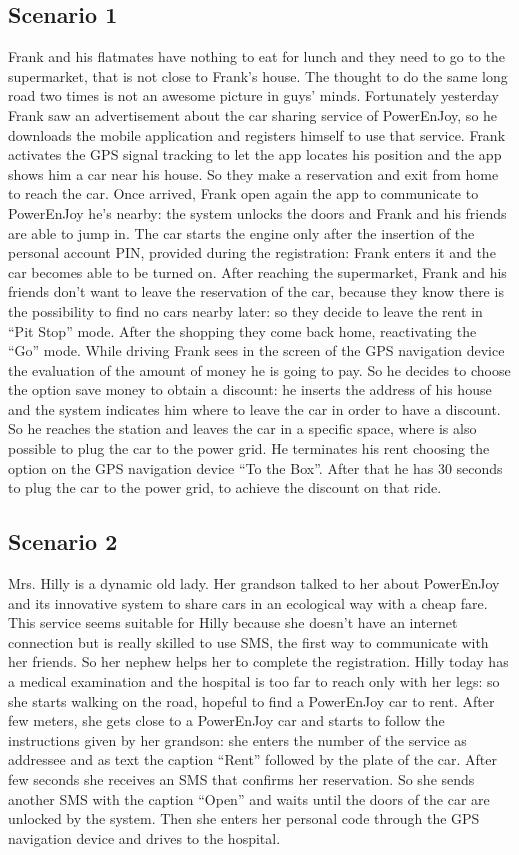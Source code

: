 \subsection{Scenario 1}
Frank and his flatmates have nothing to eat for lunch and they need to go to the supermarket, that is not close to Frank’s house.
The thought to do the same long road two times is not an awesome picture in guys’ minds.
Fortunately yesterday Frank saw an advertisement about the car sharing service of PowerEnJoy, so he downloads the mobile application and registers himself to use that service.
Frank activates the GPS signal tracking to let the app locates his position and the app shows him a car near his house.
So they make a reservation and exit from home to reach the car.
Once arrived, Frank open again the app to communicate to PowerEnJoy he’s nearby: the system unlocks the doors and Frank and his friends are able to jump in.
The car starts the engine only after the insertion of the personal account PIN, provided during the registration: Frank enters it and the car becomes able to be turned on.
After reaching the supermarket, Frank and his friends don’t want to leave the reservation of the car, because they know there is the possibility to find no cars nearby later: so they decide to leave the rent in “Pit Stop” mode.
After the shopping they come back home, reactivating the “Go” mode.
While driving Frank sees in the screen of the GPS navigation device the evaluation of the amount of money he is going to pay.
So he decides to choose the option save money to obtain a discount: he inserts the address of his house and the system indicates him where to leave the car in order to have a discount.
So he reaches the station and leaves the car in a specific space, where is also possible to plug the car to the power grid.
He terminates his rent choosing the option on the GPS navigation device  “To the Box”.
After that he has 30 seconds to plug the car to the power grid, to achieve the discount on that ride.

\subsection{Scenario 2}
Mrs. Hilly is a dynamic old lady.
Her grandson talked to her about PowerEnJoy and its innovative system to share cars in an ecological way with a cheap fare.
This service seems suitable for Hilly because she doesn’t have an internet connection but is really skilled to use SMS, the first way to communicate with her friends.
So her nephew helps her to complete the registration.
Hilly today has a medical examination and the hospital is too far to reach only with her legs: so she starts walking on the road, hopeful to find a PowerEnJoy car to rent.
After few meters, she gets close to a PowerEnJoy car and starts to follow the instructions given by her grandson: she enters the number of the service as addressee and as text the caption “Rent” followed by the plate of the car.
After few seconds she receives an SMS that confirms her reservation.
So she sends another SMS with the caption “Open” and waits until the doors of the car are unlocked by the system.
Then she enters her personal code through the GPS navigation device and drives to the hospital.

